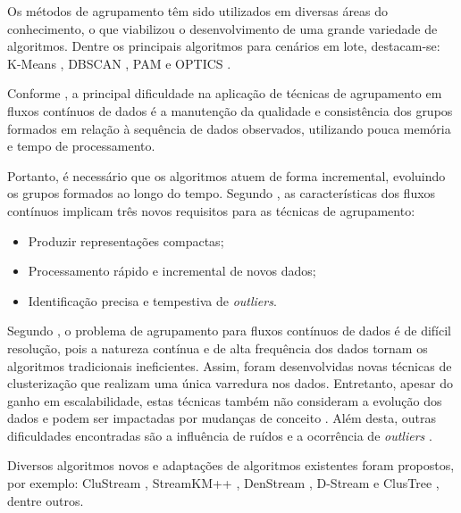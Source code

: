 \documentclass[qual, classic, a4paper]{ufbathesis}
\begin{document}
Os métodos de agrupamento têm sido utilizados em diversas áreas do conhecimento, o que viabilizou o desenvolvimento de uma grande variedade de algoritmos.
Dentre os principais algoritmos para cenários em lote, destacam-se:
K-Means \cite{Lloyd:2006:LSQ:2263356.2269955},
DBSCAN \cite{Ester:1996:DAD:3001460.3001507},
PAM \cite{kaufman:clustering1990} e 
OPTICS \cite{Ankerst:1999:OOP:304181.304187}.

Conforme \cite{Gama:2010:KDD:1855075}, a principal dificuldade na aplicação de técnicas de agrupamento em fluxos contínuos de dados é 
a manutenção da qualidade e consistência dos grupos formados em relação à sequência de dados observados, utilizando pouca memória e tempo de processamento. 

Portanto, é necessário que os algoritmos atuem de forma incremental, evoluindo os grupos formados ao longo do tempo.
Segundo \cite{Barbara:2002:RCD:507515.507519}, as características dos fluxos contínuos implicam três novos requisitos para as técnicas de agrupamento:

\begin{itemize}
    \item Produzir representações compactas;
    \item Processamento rápido e incremental de novos dados;
    \item Identificação precisa e tempestiva de \textit{outliers}.
\end{itemize}

Segundo \cite{Aggarwal:2003:FCE:1315451.1315460}, o problema de agrupamento para fluxos contínuos de dados é de difícil resolução,
pois a natureza contínua e de alta frequência dos dados tornam os algoritmos tradicionais ineficientes.
Assim, foram desenvolvidas novas técnicas de clusterização que realizam uma única varredura nos dados. 
Entretanto, apesar do ganho em escalabilidade, estas técnicas também não consideram a evolução dos dados e podem ser impactadas por mudanças de conceito \cite{Aggarwal:2003:FCE:1315451.1315460}.
Além desta, outras dificuldades encontradas são a influência de ruídos e a ocorrência de \textit{outliers} \cite{Khalilian:DBLP:journals/corr/abs-1006-5261}.

Diversos algoritmos novos e adaptações de algoritmos existentes foram propostos, por exemplo: 
CluStream \cite{Aggarwal:2003:FCE:1315451.1315460},
StreamKM++ \cite{Ackermann:2012:SCA:2133803.2184450},
DenStream \cite{Cao:Feng:Ester},
D-Stream \cite{Chen:Tu} e ClusTree \cite{Kranen:2011:CIM:2134350.2134352}, dentre outros.
\end{document}
